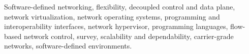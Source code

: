 \documentclass[journal]{IEEEtran}
\begin{document}



\begin{IEEEkeywords}
Software-defined networking, flexibility, decoupled control and data plane, network virtualization, network operating systems, programming and interoperability interfaces, network hypervisor, programming languages, flow-based network control, survey, scalability and dependability, carrier-grade networks, software-defined environments.
\end{IEEEkeywords}


%
\IEEEpeerreviewmaketitle








%
%
%

%




%
%
\end{document}
